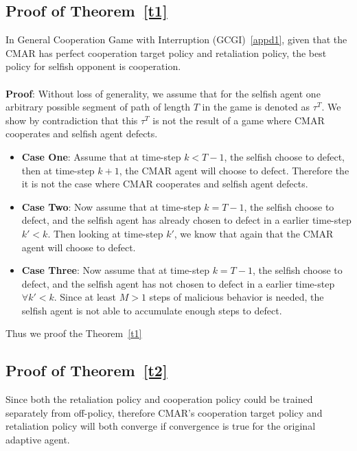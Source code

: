 \documentclass{article}
\begin{document}
\subsection{Proof of Theorem~\ref{t1}}\label{appt1}
    In General Cooperation Game with Interruption (GCGI)~\ref{appd1},
    given that the CMAR has perfect cooperation target policy and retaliation policy,
    the best policy for selfish opponent is cooperation.\\\\
\textbf{Proof}:
Without loss of generality,
we assume that for the selfish agent
one arbitrary possible segment of path of length \(T\) in the game is denoted as \(\tau^T\).
We show by contradiction that this \(\tau^T\) is not the result of a game
where CMAR cooperates and selfish agent defects.

\begin{itemize}
\item \textbf{Case One}:
Assume that at time-step \(k<T-1\), the selfish choose to defect, then at time-step \(k + 1\),
the CMAR agent will choose to defect.
Therefore the it is not the case where CMAR cooperates and selfish agent defects.

\item \textbf{Case Two}:
Now assume that at time-step \(k=T-1\), the selfish choose to defect,
and the selfish agent has already chosen to defect in a earlier time-step \(k' < k\).
Then looking at time-step \(k'\), we know that again that the CMAR agent will choose to defect.

\item \textbf{Case Three}:
Now assume that at time-step \(k=T-1\), the selfish choose to defect,
and the selfish agent has not chosen to defect in a earlier time-step \(\forall k' < k\).
Since at least \(M>1\) steps of malicious behavior is needed,
the selfish agent is not able to accumulate enough steps to defect.
\end{itemize}
Thus we proof the Theorem~\ref{t1}
\subsection{Proof of Theorem~\ref{t2}}\label{appt2}
Since both the retaliation policy and cooperation policy could be trained separately from off-policy,
therefore CMAR's cooperation target policy and retaliation policy will both converge if convergence is true for the original adaptive agent.
\end{document}
